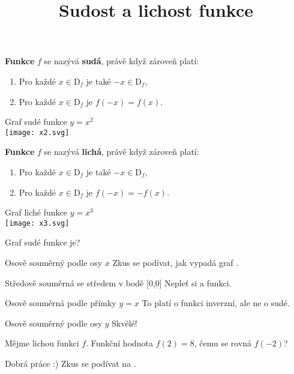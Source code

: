 \documentclass[language = czech]{webquiz}
\title{Sudost a lichost funkce}
\begin{document}
	
	\begin{discussion}\label{d1} %
		\textbf{Funkce} $f$ se nazývá \textbf{sudá}, právě když zároveň platí:
		\begin{enumerate}
			\item Pro každé $x \in \text{D}_f$ je také $-x \in \text{D}_f$,
			\item Pro každé $x \in \text{D}_f$ je $f(-x)=f(x)$.
		\end{enumerate}
		Graf sudé funkce $y=x^2$\\
		\centering
		\texttt{[image: x2.svg]}
	\end{discussion}

	\begin{discussion}\label{d2} %
			\textbf{Funkce} $f$ se nazývá \textbf{lichá}, právě když zároveň platí:
			
		\begin{enumerate}
			\item Pro každé $x \in \text{D}_f$ je také $-x \in \text{D}_f$,
			\item Pro každé $x \in \text{D}_f$ je $f(-x)=-f(x)$.
		\end{enumerate}
		
		Graf liché funkce $y=x^3$\\
		\centering
		\texttt{[image: x3.svg]}
		
	\end{discussion}
	
	\begin{question} \label{o1} 
		Graf sudé funkce je?
		
		\begin{choice}[columns=2]
			\incorrect Osově souměrný podle osy $x$
				\feedback Zkus se podívat, jak vypadá graf .
				
			\incorrect Středově souměrná se středem v bodě [0,0]
				\feedback Nepleť si  a  funkci.
				
			\incorrect Osově souměrná podle přímky $y=x$
				\feedback To platí o funkci inverzní, ale ne o sudé.
				
			\correct Osově souměrný podle osy $y$
				\feedback Skvělé! 
				
		\end{choice}	
	\end{question}
	
	\begin{question} \label{o2}
		Mějme lichou funkci $f$. Funkční hodnota $f(2) = 8$, čemu se rovná $f(-2)$?
		
		\whenRight Dobrá práce :) 
		\whenWrong Zkus se podívat na .
	\end{question}
	
\end{document}
